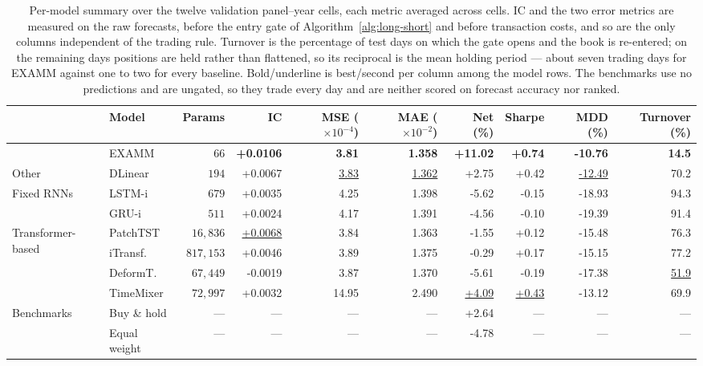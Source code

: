 \begin{table}[t]
\centering
\caption{Per-model summary over the twelve validation panel--year cells, each metric averaged across cells. IC and the two error metrics are measured on the raw forecasts, before the entry gate of Algorithm~\ref{alg:long-short} and before transaction costs, and so are the only columns independent of the trading rule. Turnover is the percentage of test days on which the gate opens and the book is re-entered; on the remaining days positions are held rather than flattened, so its reciprocal is the mean holding period --- about seven trading days for EXAMM against one to two for every baseline. Bold/underline is best/second per column among the model rows. The benchmarks use no predictions and are ungated, so they trade every day and are neither scored on forecast accuracy nor ranked.}
\label{tab:model-summary}
\begin{tabular}{llrrrrrrrr}
\toprule
 & Model & Params & IC & MSE ($\times10^{-4}$) & MAE ($\times10^{-2}$) & Net (\%) & Sharpe & MDD (\%) & Turnover (\%) \\
\midrule
 & EXAMM & $66$ & \textbf{+0.0106} & \textbf{3.81} & \textbf{1.358} & \textbf{+11.02} & \textbf{+0.74} & \textbf{-10.76} & \textbf{14.5} \\
\midrule
Other & DLinear & $194$ & +0.0067 & \underline{3.83} & \underline{1.362} & +2.75 & +0.42 & \underline{-12.49} & 70.2 \\
\midrule
\multirow{2}{*}{Fixed RNNs} & LSTM-i & $679$ & +0.0035 & 4.25 & 1.398 & -5.62 & -0.15 & -18.93 & 94.3 \\
 & GRU-i & $511$ & +0.0024 & 4.17 & 1.391 & -4.56 & -0.10 & -19.39 & 91.4 \\
\midrule
\multirow{4}{*}{Transformer-based} & PatchTST & $16{,}836$ & \underline{+0.0068} & 3.84 & 1.363 & -1.55 & +0.12 & -15.48 & 76.3 \\
 & iTransf. & $817{,}153$ & +0.0046 & 3.89 & 1.375 & -0.29 & +0.17 & -15.15 & 77.2 \\
 & DeformT. & $67{,}449$ & -0.0019 & 3.87 & 1.370 & -5.61 & -0.19 & -17.38 & \underline{51.9} \\
 & TimeMixer & $72{,}997$ & +0.0032 & 14.95 & 2.490 & \underline{+4.09} & \underline{+0.43} & -13.12 & 69.9 \\
\midrule
\multirow{2}{*}{Benchmarks} & Buy \& hold & --- & --- & --- & --- & +2.64 & --- & --- & --- \\
 & Equal weight & --- & --- & --- & --- & -4.78 & --- & --- & --- \\
\bottomrule
\end{tabular}
\end{table}
